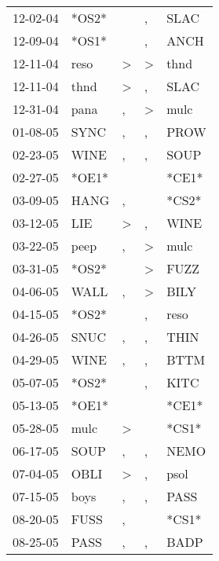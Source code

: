 \begin{supertabular}{lllll}
 12-02-04 &  *OS2* &                  &                , &   SLAC \\
 12-09-04 &  *OS1* &                  &                , &   ANCH \\
 12-11-04 &   reso &     \textgreater &     \textgreater &   thnd \\
 12-11-04 &   thnd &     \textgreater &                , &   SLAC \\
 12-31-04 &   pana &                , &     \textgreater &   mulc \\
 01-08-05 &   SYNC &                , &                , &   PROW \\
 02-23-05 &   WINE &                , &                , &   SOUP \\
 02-27-05 &  *OE1* &                  &                  &  *CE1* \\
 03-09-05 &   HANG &                , &                  &  *CS2* \\
 03-12-05 &    LIE &     \textgreater &                , &   WINE \\
 03-22-05 &   peep &                , &     \textgreater &   mulc \\
 03-31-05 &  *OS2* &                  &     \textgreater &   FUZZ \\
 04-06-05 &   WALL &                , &     \textgreater &   BILY \\
 04-15-05 &  *OS2* &                  &                , &   reso \\
 04-26-05 &   SNUC &                , &                , &   THIN \\
 04-29-05 &   WINE &                , &                , &   BTTM \\
 05-07-05 &  *OS2* &                  &                , &   KITC \\
 05-13-05 &  *OE1* &                  &                  &  *CE1* \\
 05-28-05 &   mulc &     \textgreater &                  &  *CS1* \\
 06-17-05 &   SOUP &                , &                , &   NEMO \\
 07-04-05 &   OBLI &     \textgreater &                , &   psol \\
 07-15-05 &   boys &                , &                , &   PASS \\
 08-20-05 &   FUSS &                , &                  &  *CS1* \\
 08-25-05 &   PASS &                , &                , &   BADP \\

\end{supertabular}
